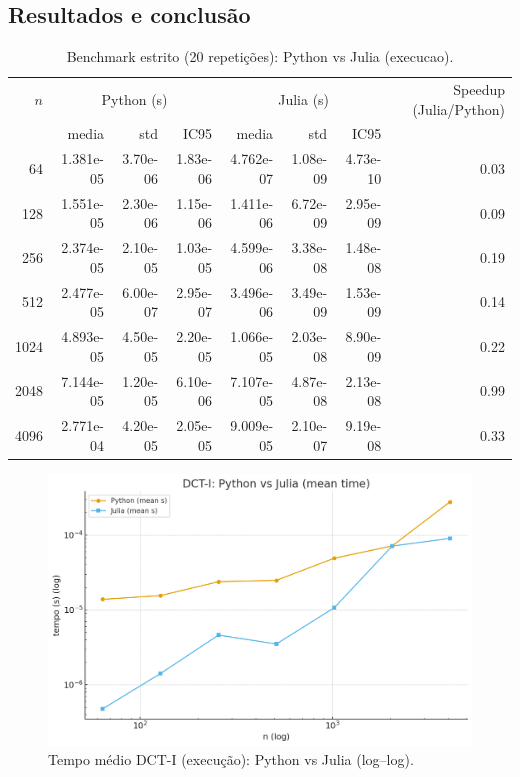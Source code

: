 \documentclass[11pt,a4paper]{article}
\begin{document}
\subsection*{Resultados e conclusão}
\begin{table}[h!]\centering
\caption{Benchmark estrito (20 repetições): Python vs Julia (execucao).}
\label{tab:bench_python_julia_strict}
\begin{tabular}{r rrr rrr r}
\toprule
$n$ & \multicolumn{3}{c}{Python (s)} & \multicolumn{3}{c}{Julia (s)} & Speedup (Julia/Python) \\
\cmidrule(lr){2-4} \cmidrule(lr){5-7}
& media & std & IC95 & media & std & IC95 & \\
\midrule
64 & 1.381e-05 & 3.70e-06 & 1.83e-06 & 4.762e-07 & 1.08e-09 & 4.73e-10 & 0.03 \\
128 & 1.551e-05 & 2.30e-06 & 1.15e-06 & 1.411e-06 & 6.72e-09 & 2.95e-09 & 0.09 \\
256 & 2.374e-05 & 2.10e-05 & 1.03e-05 & 4.599e-06 & 3.38e-08 & 1.48e-08 & 0.19 \\
512 & 2.477e-05 & 6.00e-07 & 2.95e-07 & 3.496e-06 & 3.49e-09 & 1.53e-09 & 0.14 \\
1024 & 4.893e-05 & 4.50e-05 & 2.20e-05 & 1.066e-05 & 2.03e-08 & 8.90e-09 & 0.22 \\
2048 & 7.144e-05 & 1.20e-05 & 6.10e-06 & 7.107e-05 & 4.87e-08 & 2.13e-08 & 0.99 \\
4096 & 2.771e-04 & 4.20e-05 & 2.05e-05 & 9.009e-05 & 2.10e-07 & 9.19e-08 & 0.33 \\

\bottomrule
\end{tabular}
\end{table}

\begin{figure}[h!]\centering
\includegraphics[width=0.72\linewidth]{figures/ext_perf_compare.png}
\caption{Tempo médio DCT-I (execução): Python vs Julia (log--log).}
\label{fig:ext_perf_cmp}
\end{figure}
\end{document}
